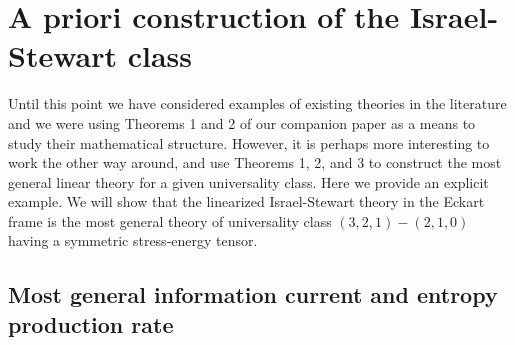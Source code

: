 \documentclass[a4paper, amsfonts, amssymb, amsmath, reprint, showkeys, nofootinbib, twoside, onecolumn,notitlepage]{revtex4-1}
\begin{document}
\section{A priori construction of the Israel-Stewart class}\label{sec:apriori}

Until this point we have considered examples of existing theories in the literature and we were using Theorems 1 and 2 of our companion paper \cite{paperI} as a means to study their mathematical structure. However, it is perhaps more interesting to work the other way around, and use Theorems 1, 2, and 3  to construct the most general linear theory for a given universality class. Here we provide an explicit example. We will show that the linearized Israel-Stewart theory in the Eckart frame \cite{Israel_Stewart_1979} is the most general theory of universality class $(3,2,1)-(2,1,0)$ having a symmetric stress-energy tensor.

\subsection{Most general information current and entropy production rate}
\end{document}
